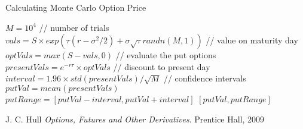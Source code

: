 \documentclass[11pt, fleqn]{article}
\let\oldReturn\Return
\renewcommand{\Return}{\State\oldReturn}
\begin{document}
\begin{algorithm}[H]
\caption{Calculating Monte Carlo Option Price}
\label{alg:mcarlo}
\begin{algorithmic}
\State $M = 10^4$ // number of trials
\State $vals=S\times exp(\tau(r-\sigma^2/2) + \sigma\sqrt{\tau}randn(M,1))$ // value on maturity day
\State $optVals=max(S-vals,0)$ // evaluate the put options
\State $presentVals=e^{-r\tau}\times optVals$ // discount to present day
\State $interval=1.96\times std(presentVals)/\sqrt{M}$ // confidence intervals
\State $putVal=mean(presentVals)$
\State $putRange = [putVal-interval, putVal+interval]$
\Return $[putVal,putRange]$
\EndFunction
\end{algorithmic}
\end{algorithm}






\begin{thebibliography}{9}
J. C. Hull
\textit{Options, Futures and Other Derivatives}. 
Prentice Hall, 2009

\end{thebibliography}
\end{document}
